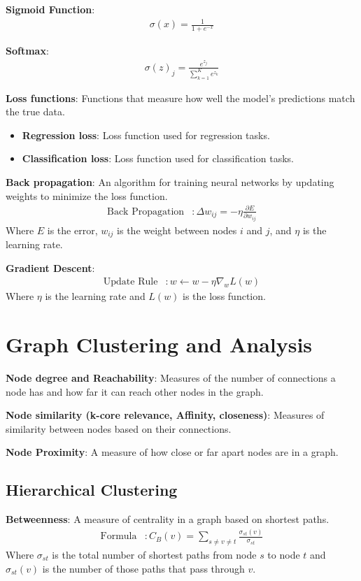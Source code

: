 \documentclass{article}
\begin{document}
\textbf{Sigmoid Function}: 
\begin{align*}
    \sigma(x) = \frac{1}{1 + e^{-x}}
\end{align*}

\textbf{Softmax}: 
\begin{align*}
    \sigma(z)_j = \frac{e^{z_j}}{\sum_{k=1}^{K} e^{z_k}}
\end{align*}

\textbf{Loss functions}: Functions that measure how well the model's predictions match the true data.
\begin{itemize}
    \item \textbf{Regression loss}: Loss function used for regression tasks.
    \item \textbf{Classification loss}: Loss function used for classification tasks.
\end{itemize}

\textbf{Back propagation}: An algorithm for training neural networks by updating weights to minimize the loss function.
\begin{align*}
    \text{Back Propagation} &: \Delta w_{ij} = -\eta \frac{\partial E}{\partial w_{ij}}
\end{align*}
Where \( E \) is the error, \( w_{ij} \) is the weight between nodes \( i \) and \( j \), and \( \eta \) is the learning rate.

\textbf{Gradient Descent}:
\begin{align*}
    \text{Update Rule} &: w \leftarrow w - \eta \nabla_w L(w)
\end{align*}
Where \( \eta \) is the learning rate and \( L(w) \) is the loss function.

\section{Graph Clustering and Analysis}

\textbf{Node degree and Reachability}: Measures of the number of connections a node has and how far it can reach other nodes in the graph.

\textbf{Node similarity (k-core relevance, Affinity, closeness)}: Measures of similarity between nodes based on their connections.

\textbf{Node Proximity}: A measure of how close or far apart nodes are in a graph.

\subsection{Hierarchical Clustering}
\textbf{Betweenness}: A measure of centrality in a graph based on shortest paths.
\begin{align*}
    \text{Formula} &: C_B(v) = \sum_{s \neq v \neq t} \frac{\sigma_{st}(v)}{\sigma_{st}}
\end{align*}
Where \( \sigma_{st} \) is the total number of shortest paths from node \( s \) to node \( t \) and \( \sigma_{st}(v) \) is the number of those paths that pass through \( v \).
\end{document}
